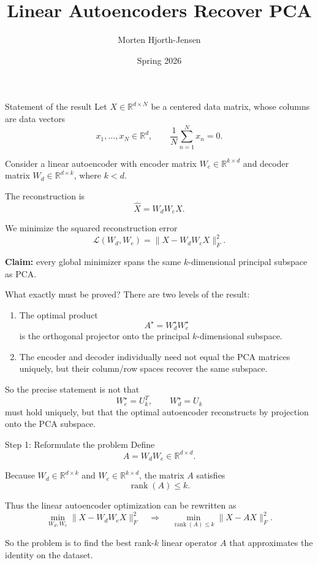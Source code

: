 \documentclass[aspectratio=169]{beamer}
\title{Linear Autoencoders Recover PCA}
\author{Morten Hjorth-Jensen}
\date{Spring 2026}
\begin{document}
\frame{\titlepage}

\begin{frame}{Statement of the result}
Let \(X\in \mathbb{R}^{d\times N}\) be a centered data matrix, whose columns are data vectors
\[
x_1,\dots,x_N\in \mathbb{R}^d,
\qquad
\frac1N \sum_{n=1}^N x_n = 0.
\]

Consider a linear autoencoder with encoder matrix \(W_e\in \mathbb{R}^{k\times d}\)
and decoder matrix \(W_d\in \mathbb{R}^{d\times k}\), where \(k<d\).

The reconstruction is
\[
\widehat X = W_d W_e X.
\]

We minimize the squared reconstruction error
\[
\mathcal L(W_d,W_e)
=
\|X-W_dW_eX\|_F^2.
\]

\medskip

\textbf{Claim:} every global minimizer spans the same \(k\)-dimensional principal subspace as PCA.
\end{frame}

\begin{frame}{What exactly must be proved?}
There are two levels of the result:

\begin{enumerate}
\item The optimal product
\[
A^\star = W_d^\star W_e^\star
\]
is the orthogonal projector onto the principal \(k\)-dimensional subspace.

\item The encoder and decoder individually need not equal the PCA matrices uniquely, but their column/row spaces recover the same subspace.
\end{enumerate}

So the precise statement is not that
\[
W_e^\star = U_k^T,\qquad W_d^\star = U_k
\]
must hold uniquely, but that the optimal autoencoder reconstructs by projection onto the PCA subspace.
\end{frame}

\begin{frame}{Step 1: Reformulate the problem}
Define
\[
A = W_d W_e \in \mathbb{R}^{d\times d}.
\]

Because \(W_d\in \mathbb{R}^{d\times k}\) and \(W_e\in \mathbb{R}^{k\times d}\),
the matrix \(A\) satisfies
\[
\operatorname{rank}(A)\le k.
\]

Thus the linear autoencoder optimization can be rewritten as
\[
\min_{W_d,W_e}\|X-W_dW_eX\|_F^2
\quad \Longrightarrow \quad
\min_{\operatorname{rank}(A)\le k}\|X-AX\|_F^2.
\]

So the problem is to find the best rank-\(k\) linear operator \(A\) that approximates the identity on the dataset.
\end{frame}
\end{document}
